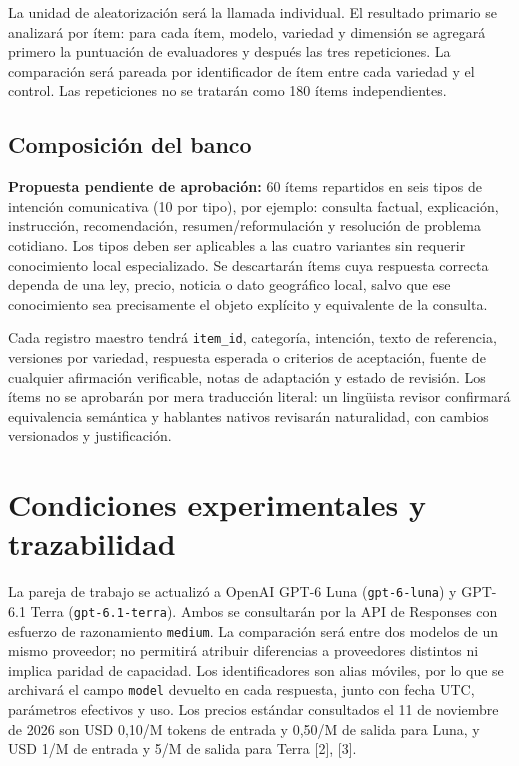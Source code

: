 \documentclass[conference]{IEEEtran}
\begin{document}
La unidad de aleatorización será la llamada individual. El resultado primario se analizará por ítem: para cada ítem, modelo, variedad y dimensión se agregará primero la puntuación de evaluadores y después las tres repeticiones. La comparación será pareada por identificador de ítem entre cada variedad y el control. Las repeticiones no se tratarán como 180 ítems independientes.

\subsection{Composición del banco}
\textbf{Propuesta pendiente de aprobación:} 60 ítems repartidos en seis tipos de intención comunicativa (10 por tipo), por ejemplo: consulta factual, explicación, instrucción, recomendación, resumen/reformulación y resolución de problema cotidiano. Los tipos deben ser aplicables a las cuatro variantes sin requerir conocimiento local especializado. Se descartarán ítems cuya respuesta correcta dependa de una ley, precio, noticia o dato geográfico local, salvo que ese conocimiento sea precisamente el objeto explícito y equivalente de la consulta.

Cada registro maestro tendrá \texttt{item\_id}, categoría, intención, texto de referencia, versiones por variedad, respuesta esperada o criterios de aceptación, fuente de cualquier afirmación verificable, notas de adaptación y estado de revisión. Los ítems no se aprobarán por mera traducción literal: un lingüista revisor confirmará equivalencia semántica y hablantes nativos revisarán naturalidad, con cambios versionados y justificación.

\section{Condiciones experimentales y trazabilidad}
La pareja de trabajo se actualizó a OpenAI GPT-6 Luna (\texttt{gpt-6-luna}) y GPT-6.1 Terra (\texttt{gpt-6.1-terra}). Ambos se consultarán por la API de Responses con esfuerzo de razonamiento \texttt{medium}. La comparación será entre dos modelos de un mismo proveedor; no permitirá atribuir diferencias a proveedores distintos ni implica paridad de capacidad. Los identificadores son alias móviles, por lo que se archivará el campo \texttt{model} devuelto en cada respuesta, junto con fecha UTC, parámetros efectivos y uso. Los precios estándar consultados el 11 de noviembre de 2026 son USD 0,10/M tokens de entrada y 0,50/M de salida para Luna, y USD 1/M de entrada y 5/M de salida para Terra [2], [3].
\end{document}
